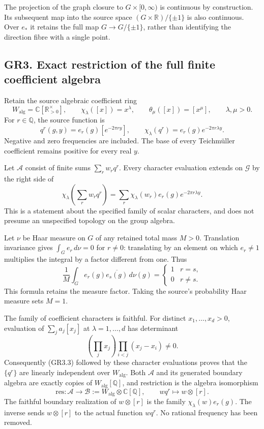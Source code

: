 The projection of the graph closure to \(G\times[0,\infty)\) is
continuous by construction. Its subsequent map into the source space
\((G\times\mathbb R)/\{\pm1\}\) is also continuous. Over \(e_*\) it
retains the full map \(G\to G/\{\pm1\}\), rather than identifying the
direction fibre with a single point.

\subsection{GR3. Exact restriction of the full finite coefficient
algebra}\label{gr3.-exact-restriction-of-the-full-finite-coefficient-algebra}

Retain the source algebraic coefficient ring \[
W_{\mathrm{alg}}=\mathbb C[\mathbb R_{>0}^{\times}],\qquad
\chi_\lambda([x])=x^\lambda,\qquad
\theta_\mu([x])=[x^\mu],\qquad \lambda,\mu>0.
\] For \(r\in\mathbb Q\), the source function is \[
q^r(g,y)=e_r(g)[e^{-2\pi r y}],\qquad
\chi_\lambda(q^r)=e_r(g)e^{-2\pi r\lambda y}.
\tag{GR3.1}
\] Negative and zero frequencies are included. The base of every
Teichmüller coefficient remains positive for every real \(y\).

Let \(\mathcal A\) consist of finite sums \(\sum_r w_rq^r\). Every
character evaluation extends on \(\mathscr G\) by the right side of \[
\chi_\lambda\!\left(\sum_r w_rq^r\right)
=\sum_r\chi_\lambda(w_r)e_r(g)e^{-2\pi r\lambda y}.
\tag{GR3.2}
\] This is a statement about the specified family of scalar characters,
and does not presume an unspecified topology on the group algebra.

Let \(\nu\) be Haar measure on \(G\) of any retained total mass \(M>0\).
Translation invariance gives \(\int_Ge_r\,d\nu=0\) for \(r\ne0\):
translating by an element on which \(e_r\ne1\) multiplies the integral
by a factor different from one. Thus \[
\frac1M\int_G e_r(g)\overline{e_s(g)}\,d\nu(g)
=\begin{cases}1&r=s,\\0&r\ne s.\end{cases}
\tag{GR3.3}
\] This formula retains the measure factor. Taking the source's
probability Haar measure sets \(M=1\).

The family of coefficient characters is faithful. For distinct
\(x_1,\ldots,x_d>0\), evaluation of \(\sum_ja_j[x_j]\) at
\(\lambda=1,\ldots,d\) has determinant \[
\left(\prod_jx_j\right)\prod_{i<j}(x_j-x_i)\ne0.
\] Consequently (GR3.3) followed by these character evaluations proves
that the \(\{q^r\}\) are linearly independent over \(W_{\mathrm{alg}}\).
Both \(\mathcal A\) and its generated boundary algebra are exactly
copies of \(W_{\mathrm{alg}}[\mathbb Q]\), and restriction is the
algebra isomorphism \[
\mathrm{res}:\mathcal A\longrightarrow
\mathcal B:=W_{\mathrm{alg}}\otimes\mathbb C[\mathbb Q],
\qquad wq^r\longmapsto w\otimes[r].
\tag{GR3.4}
\] The faithful boundary realization of \(w\otimes[r]\) is the family
\(\chi_\lambda(w)e_r(g)\). The inverse sends \(w\otimes[r]\) to the
actual function \(wq^r\). No rational frequency has been removed.


